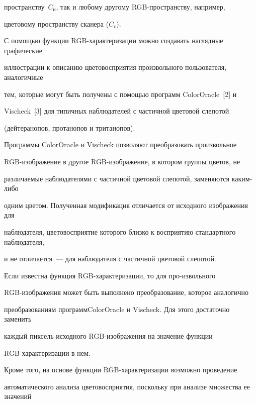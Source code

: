 пространству~$C_{\mathrm{и}}$, так и любому другому RGB-пространству, например,


цветовому пространству сканера ($C_{\mathrm{с}}$).





С помощью функции RGB-характеризации можно создавать наглядные графические


иллюстрации к описанию цветовосприятия произвольного пользователя, аналогичные


тем, которые могут быть получены с помощью программ ColorOracle~[2] и\linebreak


Vischeck~[3] для типичных наблюдателей с частичной цветовой слепотой


(дейтеранопов, протанопов и тританопов).





Программы ColorOracle и Vischeck позволяют преобразовать произвольное


RGB-изображение в другое RGB-изображение, в котором группы цветов, не


различаемые наблюдателями с час\-тич\-ной цветовой слепотой, заменяются каким-либо


одним цветом. Полученная модификация отличается от исходного изоб\-ра\-же\-ния для


наблюдателя, цветовосприятие которого близко к восприятию стандартного наблюдателя,


и не отличается~--- для наблюдателя с частичной цветовой слепотой.





Если известна функция RGB-ха\-рак\-те\-ри\-за\-ции, то для про-\linebreak извольного


RGB-изображения может быть выполнено пре\-обра\-зование, которое аналогично


преобразованиям программ\linebreak ColorOracle и Vischeck. Для этого достаточно заменить


каждый пиксель исходного RGB-изображения на значение функции


RGB-ха\-рак\-те\-ри\-за\-ции в нем.


%


Кроме того, на основе функции RGB-характеризации возможно проведение


автоматического анализа цветовосприятия, поскольку при анализе множества ее значений


